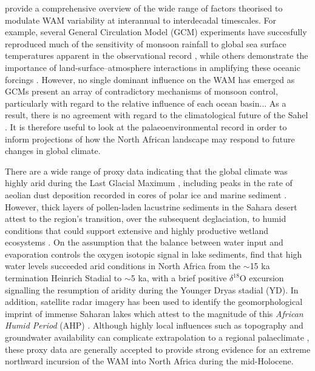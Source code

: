 \documentclass[a4paper]{article}
\newcommand{\delO}{\ensuremath{\delta ^{18}}O}
\begin{document}
\cite{nicholson2013west} provide a comprehensive overview of the wide range of factors theorised to modulate WAM variability at interannual to interdecadal timescales.
For example, several General Circulation Model (GCM) experiments have succesfully reproduced much of the sensitivity of monsoon rainfall to global sea surface temperatures apparent in the observational record \parencite[e.g.][]{rowell1995variability, giannini2003oceanic, lu2005oceanic}, while others demonstrate the importance of land-surface--atmosphere interactions in amplifying these oceanic forcings \parencite{giannini2005dynamics, kucharski2013further}.
However, no single dominant influence on the WAM has emerged as GCMs present an array of contradictory mechanisms of monsoon control, particularly with regard to the relative influence of each ocean basin... 
As a result, there is no agreement with regard to the climatological future of the Sahel \parencite{druyan2011studies}.
It is therefore useful to look at the palaeoenvironmental record in order to inform projections of how the North African landscape may respond to future changes in global climate.


There are a wide range of proxy data indicating that the global climate was highly arid during the Last Glacial Maximum \parencite{harrison2001role}, including peaks in the rate of aeolian dust deposition recorded in cores of polar ice \parencite{petit1990palaeoclimatological} and marine sediment \parencite{tiedemann1989climatic, rea1994paleoclimatic}. 
However, thick layers of pollen-laden lacustrine sediments in the Sahara desert attest to the region's transition, over the subsequent deglaciation, to humid conditions that could support extensive and highly productive wetland ecosystems \parencite{ritchie1985sediment, lezine1990across}.
On the assumption that the balance between water input and evaporation controls the oxygen isotopic signal in lake sediments, \cite{gasse1990arid} find that high water levels succeeded arid conditions in North Africa from the $\sim$15 ka termination Heinrich Stadial to $\sim$5 ka, with a brief positive \delO{} excursion signalling the resumption of aridity during the Younger Dryas stadial (YD).
In addition, satellite radar imagery has been used to identify the geomorphological imprint of immense Saharan lakes which attest to the magnitude of this \emph{African Humid Period} (AHP) \parencite{schuster2005holocene, drake2006shorelines}.
Although highly local influences such as topography and groundwater availability can complicate extrapolation to a regional palaeclimate \parencite{baumhauer1991palaeolakes}, these proxy data are generally accepted to provide strong evidence for an extreme northward incursion of the WAM into North Africa during the mid-Holocene.
\end{document}
